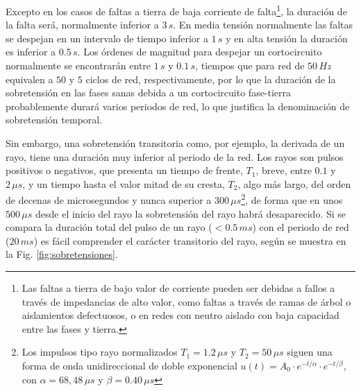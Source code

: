             Excepto en los casos de faltas a tierra de baja corriente de falta\footnote{Las faltas a tierra de bajo valor de corriente pueden ser debidas a fallos a través de impedancias de alto valor, como faltas a través de ramas de árbol o aislamientos defectuosos, o en redes con neutro aislado con baja capacidad entre las fases y tierra.}, la duración de la falta será, normalmente inferior a $3\,\textit{s}$. En media tensión normalmente las faltas se despejan en un intervalo de tiempo inferior a $1\,\textit{s}$ y en alta tensión la duración es inferior a $0.5\,\textit{s}$. Los órdenes de magnitud para despejar un cortocircuito normalmente se encontrarán entre $1\,\textit{s}$ y $0.1\,\textit{s}$, tiempos que para red de $50\,\textit{Hz}$ equivalen a $50$ y $5$ ciclos de red, respectivamente, por lo que la duración de la sobretensión en las fases sanas debida a un cortocircuito fase-tierra probablemente durará varios periodos de red, lo que justifica la denominación de sobretensión temporal.\newline

            Sin embargo, una sobretensión transitoria como, por ejemplo, la derivada de un rayo, tiene una duración muy inferior al periodo de la red. Los rayos son pulsos positivos o negativos, que presenta un tiempo de frente, $T_1$, breve, entre $0.1$ y $2\,\mu\textit{s}$, y un tiempo hasta el valor mitad de su cresta, $T_2$, algo más largo, del orden de decenas de microsegundos y nunca superior a $300\,\mu\textit{s}$\footnote{Los impulsos tipo rayo normalizados $T_1 = 1.2\,\mu\textit{s}$ y $T_2 = 50\,\mu\textit{s}$ siguen una forma de onda unidireccional de doble exponencial $u(t) = A_0 \cdot e^{-t/\alpha} \cdot e^{-t/\beta}$, con $\alpha = 68,48\,\mu\textit{s}$ y $\beta = 0.40\,\mu\textit{s}$}, de forma que en unos $500\,\mu\textit{s}$ desde el inicio del rayo la sobretensión del rayo habrá desaparecido. Si se compara la duración total del pulso de un rayo ($<0.5\,\textit{ms}$) con el periodo de red ($20\,\textit{ms}$) es fácil comprender el carácter transitorio del rayo, según se muestra en la Fig. \ref{fig:sobretensiones}.

